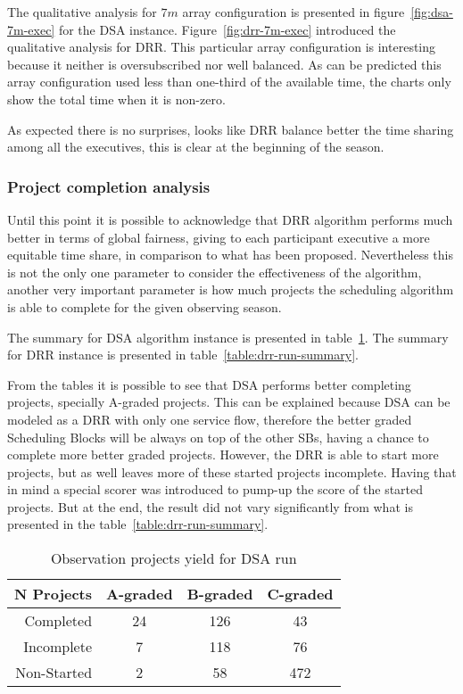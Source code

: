 The qualitative analysis for $7m$ array configuration is presented in figure~\ref{fig:dsa-7m-exec} for the DSA instance. Figure~\ref{fig:drr-7m-exec} introduced the qualitative analysis for DRR. This particular array configuration is interesting because it neither is oversubscribed nor well balanced. As can be predicted this array configuration used less than one-third of the available time, the charts only show the total time when it is non-zero.

As expected there is no surprises, looks like DRR balance better the time sharing among all the executives, this is clear at the beginning of the season. 

\subsubsection{Project completion analysis}

Until this point it is possible to acknowledge that DRR algorithm performs much better in terms of global fairness, giving to each participant executive a more equitable time share, in comparison to what has been proposed. Nevertheless this is not the only one parameter to consider the effectiveness of the algorithm, another very important parameter is how much projects the scheduling algorithm is able to complete for the given observing season.

The summary for DSA algorithm instance is presented in table~\ref{table:dsa-run-summary}. The summary for DRR instance is presented in table~\ref{table:drr-run-summary}.

From the tables it is possible to see that DSA performs better completing projects, specially A-graded projects. This can be explained because DSA can be modeled as a DRR with only one service flow, therefore the better graded Scheduling Blocks will be always on top of the other SBs, having a chance to complete more better graded projects. However, the DRR is able to start more projects, but as well leaves more of these started projects incomplete. Having that in mind a special scorer was introduced to pump-up the score of the started projects. But at the end, the result did not vary significantly from what is presented in the table~\ref{table:drr-run-summary}.

\begin{table}[b!]
\centering
\begin{tabular}{|r|c|c|c|} \hline
 N Projects & A-graded & B-graded & C-graded \\ \hline
 Completed & 24 & 126 & 43 \\ \hline
 Incomplete & 7 & 118 & 76 \\ \hline
 Non-Started & 2 & 58 & 472 \\ \hline
\end{tabular}
\caption{Observation projects yield for DSA run}
\label{table:dsa-run-summary}
\end{table}

